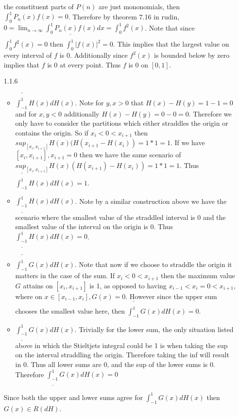 \documentclass[12pt, letterpaper]{article}
\begin{document}
\begin{enumerate}
	the constituent parts of $P(n)$ are just mononomials, then 
	$\int_0^1 P_n(x) f(x) = 0$.  Therefore by theorem 7.16 in rudin, 
	$0 = \lim_{n \to \infty} \int_0^1 P_n(x) f(x) dx = \int_0^1 f^2(x)$.
	Note that since $\int_0^1 f^2(x) = 0$ then $\bar{\int_0^1} |f(x)|^2 = 0$.
	This implies that the largest value on every interval of $f$ is 0.  
	Additionally since $f^2(x)$ is bounded below by zero implies that $f$ is 0 
	at every point.  Thus $f$ is 0 on $[0,1]$.  
	\item[1.1.6] 
	\begin{itemize}
		\item $\bar{\int_{-1}^1} H(x)dH(x)$.  Note for $y,x > 0$ that 
		$H(x)-H(y) = 1-1=0$ and for $x,y < 0$ 
		additionally $H(x) - H(y) = 0 - 0 = 0$.  Therefore we only have to 
		consider the partitions which either straddles the origin or contains
		the origin. So if $x_i < 0 < x_{i+1}$ then $sup_{[x_i,x_{i+1}]} H(x) (H(x_{i+1}-H(x_i)) = 1 * 1 = 1$.  If we have $[x_i,x_{i+1}], x_{i+1} = 0$ then 
		we have the same scenario of $sup_{[x_i,x_{i+1}]} H(x) (H(x_{i+1})-H(x_i)) = 1 * 1 = 1$.  Thus $\bar{\int_{-1}^1} H(x)dH(x) = 1$.
		\item $\underline{\int_{-1}^1} H(x)dH(x)$.  Note by a similar construction
		above we have the scenario where the smallest value of the straddled 
		interval is 0 and the smallest value of the interval on the origin is 0.
		Thus $\underline{\int_{-1}^1} H(x)dH(x) = 0$.
		\item $\bar{\int_{-1}^1} G(x)dH(x)$.  Note that now if we choose to 
		straddle the origin it matters in the case of the sum.  If $x_i < 0 < x_{i+1}$ then the maximum value $G$ attains on $[x_i,x_{i+1}]$ is 1, as opposed to 
		having $x_{i-1}< x_i = 0 < x_{i+1}$, where on $x \in [x_{i-1},x_i], G(x)=0$.  However since the upper sum chooses the smallest value here, then
		$\bar{\int_{-1}^1} G(x)dH(x) = 0$.
		\item   $\underline{\int_{-1}^1} G(x)dH(x)$.  Trivially for the lower 
		sum, the only situation listed above in which the Stieltjets integral
		could be 1 is when taking the sup on the interval straddling the origin.
		Therefore taking the inf will result in 0.  Thus all lower sums are 0, 
		and the sup of the lower sums is 0.  Therefore $\underline{\int_{-1}^1} G(x)dH(x) = 0$
	\end{itemize}
	Since both the upper and lower sums agree for $\int_{-1}^1 G(x)dH(x)$ then 
	$G(x) \in R(dH)$.  
\end{enumerate}
\end{document}
